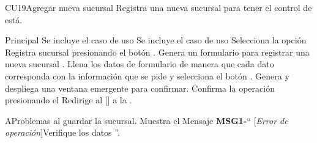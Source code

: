 \begin{UseCase}{CU19}{Agregar nueva sucursal}{
		Registra una nueva sucursal para tener el control de está.
	}
	\end{UseCase}




	\begin{UCtrayectoria}{Principal}
		\UCpaso Se incluye el caso de uso 
		\UCpaso Se incluye el caso de uso 
		\UCpaso[\UCactor] Selecciona la opción Registra sucursal presionando el botón .
		\UCpaso Genera un formulario para registrar una nueva sucursal . 
		\UCpaso[\UCactor] Llena los datos de formulario de manera que cada dato corresponda con la información que se pide y selecciona el botón  .
		\UCpaso Genera y despliega una ventana emergente para confirmar. 
		\UCpaso [\UCactor] Confirma la operación presionando el 
		\UCpaso Redirige al [\UCactor] a la  .
	\end{UCtrayectoria}




\begin{UCtrayectoriaA}{A}{Problemas al guardar la sucursal.}
			\UCpaso Muestra el Mensaje {\bf MSG1-}`` [{\em Error de operación}]Verifique los datos ''.
			
		\end{UCtrayectoriaA}

